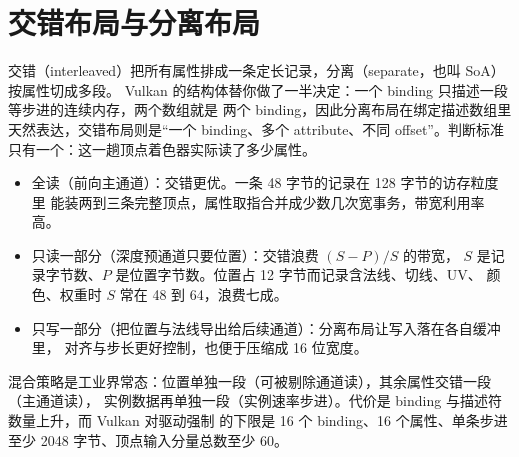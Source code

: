 \documentclass[12pt,a4paper,fontset=fandol]{ctexbook}
\begin{document}
\section{交错布局与分离布局}

交错（interleaved）把所有属性排成一条定长记录，分离（separate，也叫 SoA）按属性切成多段。
Vulkan 的结构体替你做了一半决定：一个 binding 只描述一段等步进的连续内存，两个数组就是
两个 binding，因此分离布局在绑定描述数组里天然表达，交错布局则是``一个 binding、多个
attribute、不同 offset''。判断标准只有一个：这一趟顶点着色器实际读了多少属性。

\begin{itemize}
  \item 全读（前向主通道）：交错更优。一条 48 字节的记录在 128 字节的访存粒度里
        能装两到三条完整顶点，属性取指合并成少数几次宽事务，带宽利用率高。
  \item 只读一部分（深度预通道只要位置）：交错浪费 $(S - P)/S$ 的带宽，
        $S$ 是记录字节数、$P$ 是位置字节数。位置占 12 字节而记录含法线、切线、UV、
        颜色、权重时 $S$ 常在 48 到 64，浪费七成。
  \item 只写一部分（把位置与法线导出给后续通道）：分离布局让写入落在各自缓冲里，
        对齐与步长更好控制，也便于压缩成 16 位宽度。
\end{itemize}

混合策略是工业界常态：位置单独一段（可被剔除通道读），其余属性交错一段（主通道读），
实例数据再单独一段（实例速率步进）。代价是 binding 与描述符数量上升，而 Vulkan 对驱动强制
的下限是 16 个 binding、16 个属性、单条步进至少 2048 字节、顶点输入分量总数至少 60。
\end{document}
